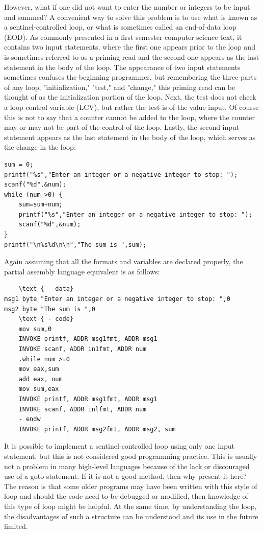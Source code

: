 \documentclass[10pt]{article}
\begin{document}
However, what if one did not want to enter the number or integers to be input and summed? A convenient way to solve this problem is to use what is known as a sentinel-controlled loop, or what is sometimes called an end-of-data loop (EOD). As commonly presented in a first semester computer science text, it contains two input statements, where the first one appears prior to the loop and is sometimes referred to as a priming read and the second one appears as the last statement in the body of the loop. The appearance of two input statements sometimes confuses the beginning programmer, but remembering the three parts of any loop, "initialization," "test," and "change," this priming read can be thought of as the initialization portion of the loop. Next, the test does not check a loop control variable (LCV), but rather the test is of the value input. Of course this is not to say that a counter cannot be added to the loop, where the counter may or may not be part of the control of the loop. Lastly, the second input statement appears as the last statement in the body of the loop, which serves as the change in the loop:

\begin{verbatim}
sum = 0;
printf("%s","Enter an integer or a negative integer to stop: ");
scanf("%d",&num);
while (num >0) {
    sum=sum+num;
    printf("%s","Enter an integer or a negative integer to stop: ");
    scanf("%d",&num);
}
printf("\n%s%d\n\n","The sum is ",sum);
\end{verbatim}

Again assuming that all the formats and variables are declared properly, the partial assembly language equivalent is as follows:

\begin{verbatim}
    \text { - data}
msg1 byte "Enter an integer or a negative integer to stop: ",0
msg2 byte "The sum is ",0
    \text { - code}
    mov sum,0
    INVOKE printf, ADDR msg1fmt, ADDR msg1
    INVOKE scanf, ADDR in1fmt, ADDR num
    .while num >=0
    mov eax,sum
    add eax, num
    mov sum,eax
    INVOKE printf, ADDR msg1fmt, ADDR msg1
    INVOKE scanf, ADDR inlfmt, ADDR num
    - endw
    INVOKE printf, ADDR msg2fmt, ADDR msg2, sum
\end{verbatim}

It is possible to implement a sentinel-controlled loop using only one input statement, but this is not considered good programming practice. This is usually not a problem in many high-level languages because of the lack or discouraged use of a goto statement. If it is not a good method, then why present it here? The reason is that some older programs may have been written with this style of loop and should the code need to be debugged or modified, then knowledge of this type of loop might be helpful. At the same time, by understanding the loop, the disadvantages of such a structure can be understood and its use in the future limited.
\end{document}
